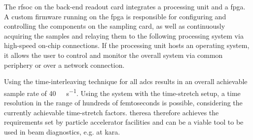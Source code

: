 The \gls{rfsoc} on the back-end readout card integrates a processing unit and a \gls{fpga}. 
A custom firmware running on the \gls{fpga} is responsible for configuring and controlling the components on the sampling card, as well as continuously acquiring the samples and relaying them to the following processing system via high-speed on-chip connections.
If the processing unit hosts an operating system, it allows the user to control and monitor the overall system via common periphery or over a network connection.

Using the time-interleaving technique for all \glspl{adc} results in an overall achievable sample rate of \SI{40}{\giga \sample \per \second}.  %
Using the system with the time-stretch setup, a time resolution in the range of hundreds of femtoseconds is possible, considering the currently achievable time-stretch factors.
\gls{theresa} therefore achieves the requirements set by particle accelerator facilities and can be a viable tool to be used in beam diagnostics, e.g. at \gls{kara}.
